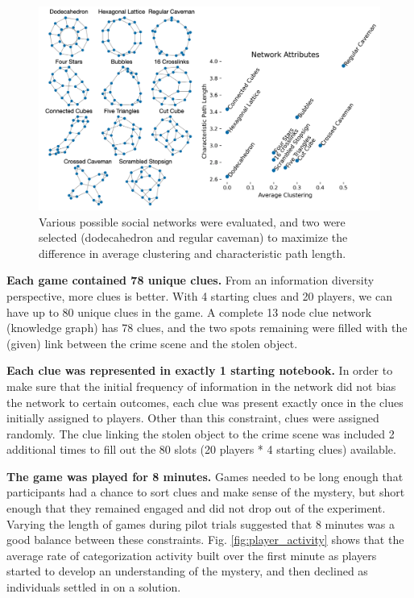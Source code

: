 \documentclass{article}
\begin{document}
\begin{figure}[h!]
\centering
\includegraphics[width=0.9\columnwidth]{All Networks.png}
\caption{Various possible social networks were evaluated, and two were selected (dodecahedron and regular caveman) to maximize the difference in average clustering and characteristic path length.}
\label{fig:all_networks}
\end{figure}

\textbf{Each game contained 78 unique clues.}
From an information diversity perspective, more clues is better. With 4 starting clues and 20 players, we can have up to 80 unique clues in the game. A complete 13 node clue network (knowledge graph) has 78 clues, and the two spots remaining were filled with the (given) link between the crime scene and the stolen object. 

\textbf{Each clue was represented in exactly 1 starting notebook.}
In order to make sure that the initial frequency of information in the network did not bias the network to certain outcomes, each clue was present exactly once in the clues initially assigned to players. Other than this constraint, clues were assigned randomly. The clue linking the stolen object to the crime scene was included 2 additional times to fill out the 80 slots (20 players * 4 starting clues) available.

\textbf{The game was played for 8 minutes.} 
Games needed to be long enough that participants had a chance to sort clues and make sense of the mystery, but short enough that they remained engaged and did not drop out of the experiment. Varying the length of games during pilot trials suggested that 8 minutes was a good balance between these constraints. Fig. \ref{fig:player_activity} shows that the average rate of categorization activity built over the first minute as players started to develop an understanding of the mystery, and then declined as individuals settled in on a solution.
\end{document}
